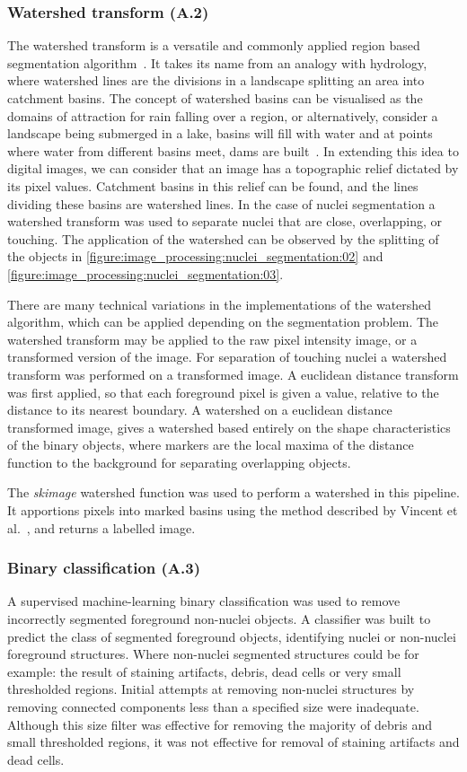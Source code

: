 \subsubsection{Watershed transform (A.2)}
The watershed transform is a versatile and commonly applied region based segmentation algorithm~\cite{Vincent1991}. It takes its name from an analogy with hydrology, where watershed lines are the divisions in a landscape splitting an area into catchment basins. The concept of watershed basins can be visualised as the domains of attraction for rain falling over a region, or alternatively, consider a landscape being submerged in a lake, basins will fill with water and at points where water from different basins meet, dams are built~\cite{Roerdink2000}. In extending this idea to digital images, we can consider that an image has a topographic relief dictated by its pixel values. Catchment basins in this relief can be found, and the lines dividing these basins are watershed lines. In the case of nuclei segmentation a watershed transform was used to separate nuclei that are close, overlapping, or touching. The application of the watershed can be observed by the splitting of the objects in \autoref{figure:image_processing:nuclei_segmentation:02} and \autoref{figure:image_processing:nuclei_segmentation:03}.

There are many technical variations in the implementations of the watershed algorithm, which can be applied depending on the segmentation problem. The watershed transform may be applied to the raw pixel intensity image, or a transformed version of the image. For separation of touching nuclei a watershed transform was performed on a transformed image. A euclidean distance transform was first applied, so that each foreground pixel is given a value, relative to the distance to its nearest boundary. A watershed on a euclidean distance transformed image, gives a watershed based entirely on the shape characteristics of the binary objects, where markers are the local maxima of the distance function to the background for separating overlapping objects.

The \emph{skimage} watershed function was used to perform a watershed in this pipeline. It apportions pixels into marked basins using the method described by Vincent et al.~\cite{Vincent1991}, and returns a labelled image.

\subsubsection{Binary classification (A.3)}
A supervised machine-learning binary classification was used to remove incorrectly segmented foreground non-nuclei objects. A classifier was built to predict the class of segmented foreground objects, identifying nuclei or non-nuclei foreground structures. Where non-nuclei segmented structures could be for example: the result of staining artifacts, debris, dead cells or very small thresholded regions. Initial attempts at removing non-nuclei structures by removing connected components less than a specified size were inadequate. Although this size filter was effective for removing the majority of debris and small thresholded regions, it was not effective for removal of staining artifacts and dead cells.

